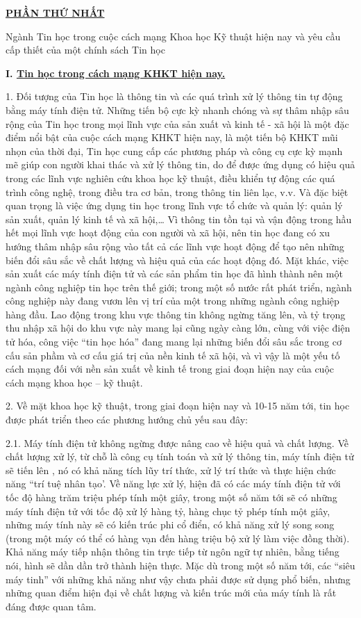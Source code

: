 \documentclass[11pt, a4paper, reqno, oneside]{book}
\begin{document}
\begin{center}
\textbf{\underline{ PHẦN THỨ NHẤT}}
\end{center}

Ngành Tin học trong cuộc cách mạng Khoa học Kỹ thuật hiện nay và yêu cầu cấp thiết của một chính sách Tin học

\textbf{I.	\underline {Tin học trong cách mạng KHKT hiện nay.}}


1.	Đối tượng của Tin học là thông tin và các quá trình xử lý thông tin tự động bằng máy tính điện tử. Những tiến bộ cực kỳ nhanh chóng và sự thâm nhập sâu rộng của Tin học trong mọi lĩnh vực của sản xuất và kinh tế - xã hội là một đặc điểm nổi bật của cuộc cách mạng KHKT hiện nay, là một tiến bộ KHKT mũi nhọn của thời đại, Tin học cung cấp các phương pháp và công cụ cực kỳ mạnh mẽ giúp con người khai thác và xử lý thông tin, do để được ứng dụng có hiệu quả trong các lĩnh vực nghiên cứu khoa học kỹ thuật, điều khiển tự động các quá trình công nghệ, trong điều tra cơ bản, trong thông tin liên lạc, v.v. Và đặc biệt quan trọng là việc ứng dụng tin học trong lĩnh vực tổ chức và quản lý: quản lý sản xuất, quản lý kinh tế và xã hội,… Vì thông tin tồn tại và vận động trong hầu hết mọi lĩnh vực hoạt động của con người và xã hội, nên tin học đang có xu hướng thâm nhập sâu rộng vào tất cả các lĩnh vực hoạt động để tạo nên những biến đổi sâu sắc về chất lượng và hiệu quả của các hoạt động đó. Mặt khác, việc sản xuất các máy tính điện tử và các sản phẩm tin học đã hình thành nên một ngành công nghiệp tin học trên thế giới; trong một số nước rất phát triển, ngành công nghiệp này đang vươn lên vị trí của một trong những ngành công nghiệp hàng đầu. Lao động trong khu vực thông tin không ngừng tăng lên, và tỷ trọng thu nhập xã hội do khu vực này mang lại cũng ngày càng lớn, cùng với việc điện tử hóa, công việc “tin học hóa” đang mang lại những biến đổi sâu sắc trong cơ cấu sản phầm và cơ cấu giá trị của nền kinh tế xã hội, và vì vậy là một yếu tố cách mạng đối với nền sản xuất về kinh tế trong giai đoạn hiện nay của cuộc cách mạng khoa học – kỹ thuật.


2.	 Về mặt khoa học kỹ thuật, trong giai đoạn hiện nay và 10-15 năm tới, tin học được phát triển theo các phương hướng chủ yếu sau đây:


2.1.	 Máy tính điện tử không ngừng được nâng cao về hiệu quả và chất lượng. Về chất lượng xử lý, từ chỗ là công cụ tính toán và xử lý thông tin, máy tính điện tử sẽ tiến lên , nó có khả năng tích lũy trí thức, xử lý trí thức và thực hiện chức năng “trí tuệ nhân tạo’. Về năng lực xử lý, hiện đã có các máy tính điện tử với tốc độ hàng trăm triệu phép tính một giây, trong một số năm tới sẽ có những máy tính điện tử với tốc độ xử lý hàng tỷ, hàng chục tỷ phép tính một giây, những máy tính này sẽ có kiến trúc phi cổ điển, có khả năng xử lý song song (trong một máy có thể có hàng vạn đến hàng triệu bộ xử lý làm việc đồng thời). Khả năng máy tiếp nhận thông tin trực tiếp từ ngôn ngữ tự nhiên, bằng tiếng nói, hình sẽ dần dần trở thành hiện thực. Mặc dù trong một số năm tới, các “siêu máy tinh” với những khả năng như vậy chưa phải được sử dụng phổ biến, nhưng những quan điểm hiện đại về chất lượng và kiến trúc mới của máy tính là rất đáng được quan tâm.
\end{document}
